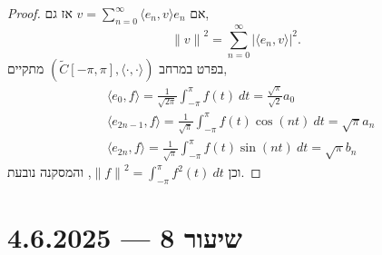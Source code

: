 \begin{proof}
	אם $v = \sum_{n = 0}^\infty \langle e_n, v \rangle e_n$ אז גם,
	\[
		{\lVert v \rVert}^2
		= \sum_{n = 0}^\infty {| \langle e_n, v \rangle |}^2
	.\]
	בפרט במרחב $(\tilde{C}[-\pi, \pi], \langle \cdot, \cdot \rangle)$ מתקיים,
	\begin{align*}
		& \langle e_0, f \rangle
		= \frac{1}{\sqrt{2 \pi}} \int_{-\pi}^{\pi} f(t)\ dt
		= \frac{\sqrt{\pi}}{\sqrt{2}} a_0 \\
		& \langle e_{2n - 1}, f \rangle
		= \frac{1}{\sqrt{\pi}} \int_{-\pi}^{\pi} f(t) \cos(n t)\ dt
		= \sqrt{\pi} a_n \\
		& \langle e_{2n}, f \rangle
		= \frac{1}{\sqrt{\pi}} \int_{-\pi}^{\pi} f(t) \sin(n t)\ dt
		= \sqrt{\pi} b_n
	\end{align*}
	וכן ${\lVert f \rVert}^2 = \int_{-\pi}^{\pi} f^2(t)\ dt$, והמסקנה נובעת.
\end{proof}

\section{שיעור 8 --- 4.6.2025}

